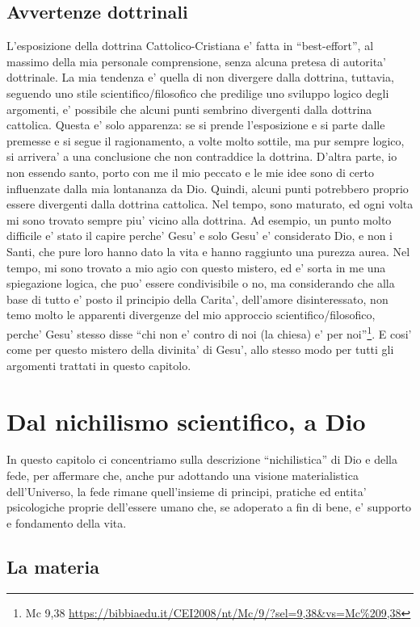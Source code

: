 \subsection{Avvertenze dottrinali}
L'esposizione della dottrina Cattolico-Cristiana e' fatta in ``best-effort'', al massimo della mia personale comprensione, senza alcuna pretesa di autorita' dottrinale. La mia tendenza e' quella di non divergere dalla dottrina, tuttavia, seguendo uno stile scientifico/filosofico che predilige uno sviluppo logico degli argomenti, e' possibile che alcuni punti sembrino divergenti dalla dottrina cattolica. Questa e' solo apparenza: se si prende l'esposizione e si parte dalle premesse e si segue il ragionamento, a volte molto sottile, ma pur sempre logico, si arrivera' a una conclusione che non contraddice la dottrina. D'altra parte, io non essendo santo, porto con me il mio peccato e le mie idee sono di certo influenzate dalla mia lontananza da Dio. Quindi, alcuni punti potrebbero proprio essere divergenti dalla dottrina cattolica. Nel tempo, sono maturato, ed ogni volta mi sono trovato sempre piu' vicino alla dottrina. Ad esempio, un punto molto difficile e' stato il capire perche' Gesu' e solo Gesu' e' considerato Dio, e non i Santi, che pure loro hanno dato la vita e hanno raggiunto una purezza aurea. Nel tempo, mi sono trovato a mio agio con questo mistero, ed e' sorta in me una spiegazione logica, che puo' essere condivisibile o no, ma considerando che alla base di tutto e' posto il principio della Carita', dell'amore disinteressato, non temo molto le apparenti divergenze del mio approccio scientifico/filosofico, perche' Gesu' stesso disse ``chi non e' contro di noi (la chiesa) e' per noi''\footnote{Mc 9,38 \url{https://bibbiaedu.it/CEI2008/nt/Mc/9/?sel=9,38\&vs=Mc\%209,38}}. E cosi' come per questo mistero della divinita' di Gesu', allo stesso modo per tutti gli argomenti trattati in questo capitolo.


\section{Dal nichilismo scientifico, a Dio}
\label{nichilismoScientifico}
In questo capitolo ci concentriamo sulla descrizione ``nichilistica'' di Dio e della fede, per affermare che, anche pur adottando una visione materialistica dell'Universo, la fede rimane quell'insieme di principi, pratiche ed entita' psicologiche proprie dell'essere umano che, se adoperato a fin di bene, e' supporto e fondamento della vita.

\subsection{La materia}

